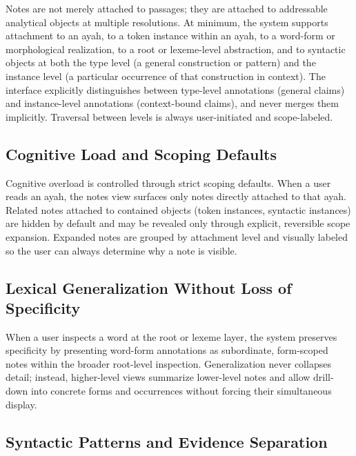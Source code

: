 \documentclass[12pt,a4paper]{article}
\begin{document}
Notes are not merely attached to passages; they are attached to
addressable analytical objects at multiple resolutions. At minimum, the
system supports attachment to an ayah, to a token instance within an
ayah, to a word-form or morphological realization, to a root or
lexeme-level abstraction, and to syntactic objects at both the type
level (a general construction or pattern) and the instance level (a
particular occurrence of that construction in context). The interface
explicitly distinguishes between type-level annotations (general claims)
and instance-level annotations (context-bound claims), and never merges
them implicitly. Traversal between levels is always user-initiated and
scope-labeled.

\subsection{Cognitive Load and Scoping
Defaults}\label{cognitive-load-and-scoping-defaults}

Cognitive overload is controlled through strict scoping defaults. When a
user reads an ayah, the notes view surfaces only notes directly attached
to that ayah. Related notes attached to contained objects (token
instances, syntactic instances) are hidden by default and may be
revealed only through explicit, reversible scope expansion. Expanded
notes are grouped by attachment level and visually labeled so the user
can always determine why a note is visible.

\subsection{Lexical Generalization Without Loss of
Specificity}\label{lexical-generalization-without-loss-of-specificity}

When a user inspects a word at the root or lexeme layer, the system
preserves specificity by presenting word-form annotations as
subordinate, form-scoped notes within the broader root-level inspection.
Generalization never collapses detail; instead, higher-level views
summarize lower-level notes and allow drill-down into concrete forms and
occurrences without forcing their simultaneous display.

\subsection{Syntactic Patterns and Evidence
Separation}\label{syntactic-patterns-and-evidence-separation}
\end{document}
